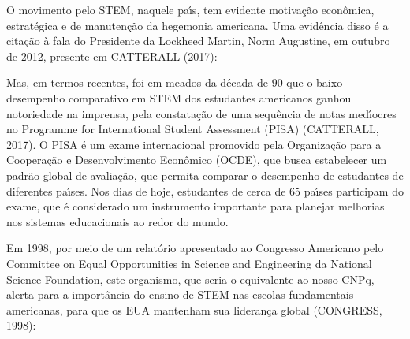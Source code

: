 \documentclass[
12pt,		%
openright,	%
twoside,  %
a4paper,			%
chapter=TITLE,		%
english,			%
french,				%
spanish,			%
brazil				%
]{USPSC-classe/USPSC}
\begin{document}
O movimento pelo STEM, naquele pa\'{\i}s, tem evidente motiva\c{c}\~ao econ\^omica, estrat\'egica e de manuten\c{c}\~ao da hegemonia americana. Uma evid\^encia disso \'e a cita\c{c}\~ao \`a fala do Presidente da Lockheed Martin, Norm Augustine, em outubro de 2012, presente em  CATTERALL (2017):


















\noindent\begin{center}\mbox{\centering{}}\end{center}


Mas, em termos recentes, foi em meados da d\'ecada de 90 que o baixo desempenho comparativo em STEM dos estudantes americanos ganhou notoriedade na imprensa, pela constata\c{c}\~ao de uma sequ\^encia de notas med\'{\i}ocres no Programme for International Student Assessment (PISA)  (CATTERALL, 2017). O PISA \'e um exame internacional promovido pela Organiza\c{c}\~ao para a Coopera\c{c}\~ao e Desenvolvimento Econ\^omico (OCDE), que busca estabelecer um padr\~ao global de avalia\c{c}\~ao, que permita comparar o desempenho de estudantes de diferentes pa\'{\i}ses. Nos dias de hoje, estudantes de cerca de 65 pa\'{\i}ses participam do exame, que \'e considerado um instrumento importante para planejar melhorias nos sistemas educacionais ao redor do mundo.

















Em 1998, por meio de um relat\'orio apresentado ao Congresso Americano pelo Committee on Equal Opportunities in Science and Engineering da National Science Foundation, este organismo, que seria o equivalente ao nosso CNPq, alerta para a import\^ancia do ensino de STEM nas escolas fundamentais americanas, para que os EUA mantenham sua lideran\c{c}a global  (CONGRESS, 1998):
\end{document}
